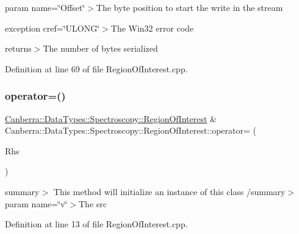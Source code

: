 param name=\char`\"{}\+Offset\char`\"{}$>$The byte position to start the write in the stream

exception cref=\char`\"{}\+U\+L\+O\+N\+G\char`\"{}$>$The Win32 error code

returns$>$The number of bytes serialized

Definition at line 69 of file Region\+Of\+Interest.\+cpp.

\mbox{\label{class_canberra_1_1_data_types_1_1_spectroscopy_1_1_region_of_interest_ac23add1024b2fa1a5355847f2a633cbe_ac23add1024b2fa1a5355847f2a633cbe}} 
\subsubsection{\texorpdfstring{operator=()}{operator=()}}
{\footnotesize\ttfamily \hyperlink{class_canberra_1_1_data_types_1_1_spectroscopy_1_1_region_of_interest}{Canberra\+::\+Data\+Types\+::\+Spectroscopy\+::\+Region\+Of\+Interest} \& Canberra\+::\+Data\+Types\+::\+Spectroscopy\+::\+Region\+Of\+Interest\+::operator= (\begin{DoxyParamCaption}\item[{const \hyperlink{class_canberra_1_1_data_types_1_1_spectroscopy_1_1_region_of_interest}{Region\+Of\+Interest} \&}]{Rhs }\end{DoxyParamCaption})}

summary$>$ This method will initialize an instance of this class /summary$>$ param name=\char`\"{}v\char`\"{}$>$The src

Definition at line 13 of file Region\+Of\+Interest.\+cpp.

\mbox{\label{class_canberra_1_1_data_types_1_1_spectroscopy_1_1_region_of_interest_ae1820eab6fe54c57dbe26acd8735d06d_ae1820eab6fe54c57dbe26acd8735d06d}} 
